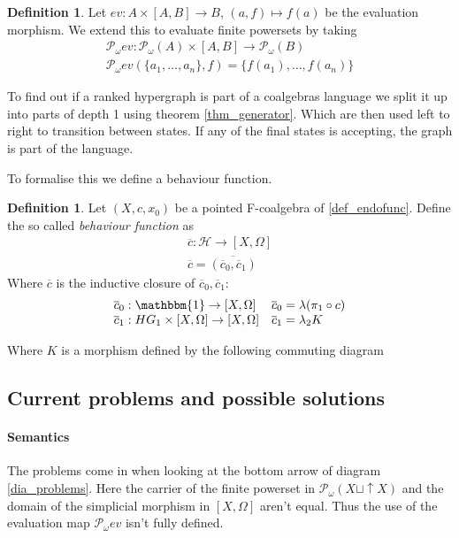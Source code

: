 \documentclass[12pt]{article}
\theoremstyle{definition}
\newtheorem{definition}[theorem]{Definition}
\newcommand{\1}{\mathbbm{1}}
\newcommand{\id}{\text{id}}
\renewcommand{\H}{\mathcal{H}}
\newcommand{\finP}{\mathcal{P}_{\omega}}
\newcommand{\beh}{\overline{c}}
\begin{document}
\begin{definition}
    Let $ev: A\times [A,B] \to B$, $(a, f)\mapsto f(a)$ be the evaluation morphism. We extend this to evaluate finite powersets by taking
    \begin{align*}
        \finP ev: \finP(A)\times [A,B] \to \finP(B)\\
        \finP ev(\{a_1, \dots, a_n\}, f) = \{f(a_1), \dots, f(a_n)\}
    \end{align*}
\end{definition}

To find out if a ranked hypergraph is part of a coalgebras language we split it up into parts of depth 1 using theorem \ref{thm_generator}. Which are then used left to right to transition between states. If any of the final states is accepting, the graph is part of the language.

To formalise this we define a behaviour function.

\begin{definition}
    Let $(X, c, x_0)$ be a pointed F-coalgebra of \ref{def_endofunc}. Define the so called \emph{behaviour function} as
    \begin{align*}
        \beh : \H \to [X, \Omega] \\
        \beh = \overline{(\beh_0, \beh_1)}
    \end{align*}
    Where $\beh$ is the inductive closure of $\beh_0, \beh_1$:\\
    \[
        \begin{array}{ll}
            \beh_0: \1 \to [X, \Omega] & \beh_0 = \lambda(\pi_1\circ c)\\
            \beh_1: HG_1\times [X, \Omega] \to [X, \Omega] & \beh_1 = \lambda_2 K
        \end{array}
    \]

    Where $K$ is a morphism defined by the following commuting diagram
    \begin{center}\label{dia_problems}
    \end{center}
\end{definition}
\subsection{Current problems and possible solutions}\label{sec:coalg_problems} \paragraph{Semantics}The problems come in when looking at the bottom arrow of diagram \ref{dia_problems}. Here the carrier of the finite powerset in $\finP(X\sqcup \uparrow X)$ and the domain of the simplicial morphism in $[X,\Omega]$ aren't equal. Thus the use of the evaluation map $\finP ev$ isn't fully defined.
\end{document}
